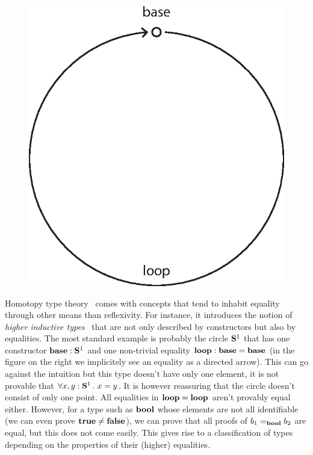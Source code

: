 \documentclass[11pt]{article}
\theoremstyle{plain}
\theoremstyle{remark}
\begin{document}
\begin{figure}
    \centering
    \includegraphics[scale=.4]{s1.eps}
\end{figure}
Homotopy type theory~\cite{HoTTbook} comes with concepts that tend to inhabit
equality through other means than reflexivity. For instance, it introduces the
notion of \emph{higher inductive types}~\cite{lumsdaine2013higher} that are not
only described by constructors but also by equalities.
The most standard example is probably the circle $\S1$ that has one constructor
$\base : \S1$ and one non-trivial equality $\operatorname{\mathbf{loop}} : \operatorname{\mathbf{base}} = \operatorname{\mathbf{base}}$
(in the figure on the right we implicitely see an equality as a directed arrow).
This can go against the intuition but this type doesn't have only one element,
\ie it is not provable that $\forall x,y : \S1.\ x = y$. It is however
reassuring that the circle doesn't consist of only one point.
All equalities in $\operatorname{\mathbf{loop}} = \operatorname{\mathbf{loop}}$ aren't provably equal either.
However, for a type such as $\operatorname{\mathbf{bool}}$ whose elements are not all
identifiable (we can even prove $\operatorname{\mathbf{true}} \neq \operatorname{\mathbf{false}}$), we can prove that all
proofs of $b_1 =_{\operatorname{\mathbf{bool}}} b_2$ are equal, but this does not come easily.
This gives rise to a classification of types depending on the properties
of their (higher) equalities.
\end{document}
